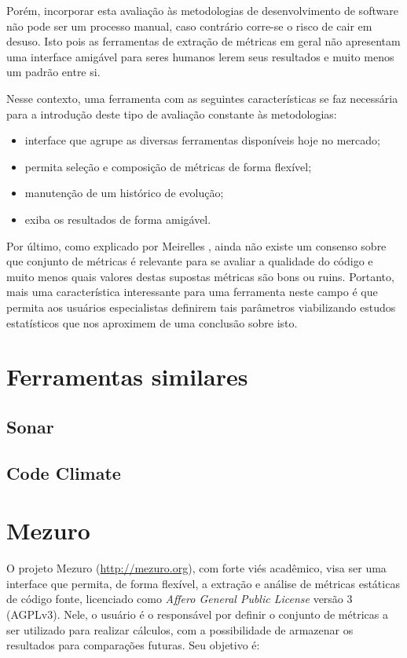 \documentclass[12pt]{article}
\begin{document}
Porém, incorporar esta avaliação às metodologias de desenvolvimento de software não pode ser um processo manual, caso contrário corre-se o risco de cair em desuso. Isto pois as ferramentas de extração de métricas em geral não apresentam uma interface amigável para seres humanos lerem seus resultados e muito menos um padrão entre si.

Nesse contexto, uma ferramenta com as seguintes características se faz necessária para a introdução deste tipo de avaliação constante às metodologias:

\begin{itemize}
  \item interface que agrupe as diversas ferramentas disponíveis hoje no mercado;
  \item permita seleção e composição de métricas de forma flexível;
  \item manutenção de um histórico de evolução;
  \item exiba os resultados de forma amigável.
\end{itemize}

Por último, como explicado por Meirelles \cite{m13}, ainda não existe um consenso sobre que conjunto de métricas é relevante para se avaliar a qualidade do código e muito menos quais valores destas supostas métricas são bons ou ruins. Portanto, mais uma característica interessante para uma ferramenta neste campo é que permita aos usuários especialistas definirem tais parâmetros viabilizando estudos estatísticos que nos aproximem de uma conclusão sobre isto.

\section{Ferramentas similares}

  \subsection{Sonar}

  \subsection{Code Climate}

\section{Mezuro}
O projeto Mezuro (\url{http://mezuro.org}), com forte viés acadêmico, visa ser uma interface que permita, de forma flexível, a extração e análise de métricas estáticas de código fonte, licenciado como \textit{Affero General Public License} versão 3 (AGPLv3). Nele, o usuário é o responsável por definir o conjunto de métricas a ser utilizado para realizar cálculos, com a possibilidade de armazenar os resultados para comparações futuras. Seu objetivo é:
\end{document}
